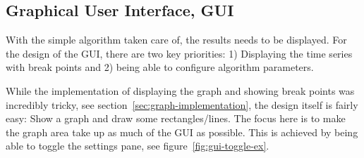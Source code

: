 \subsection{Graphical User Interface, GUI} \label{sec:gui-design}

With the simple algorithm taken care of, the results needs to be displayed. For 
the design of the GUI, there are two key priorities: 1) Displaying the time
series with break points and 2) being able to configure algorithm parameters. 

While the implementation of displaying the graph and showing break points was incredibly tricky, see
section~\ref{sec:graph-implementation}, the design itself is fairly easy: Show a
graph and draw some rectangles/lines. The focus here is to make the graph area
take up as much of the GUI as possible. This is achieved by being able to toggle
the settings pane, see figure~\ref{fig:gui-toggle-ex}. 

